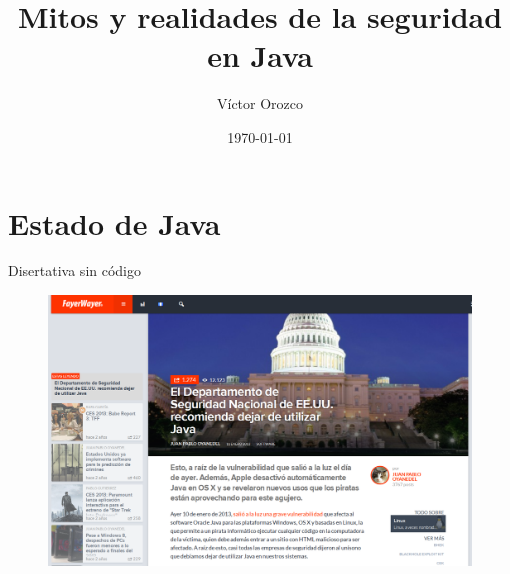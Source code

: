 \documentclass[12pt]{beamer}
\title{Mitos y realidades de la seguridad en Java}
\author{Víctor Orozco}
\institute{Nabenik}
\date{\today}
\begin{document}
{
%
\frame{\titlepage}
}

\section{Estado de Java}

\begin{frame}
\LARGE \centering Disertativa sin código
\end{frame}

\begin{frame}
\begin{figure}
\centering
\includegraphics[width=\linewidth]{Images/not1}
\end{figure}
\end{frame}
\end{document}
